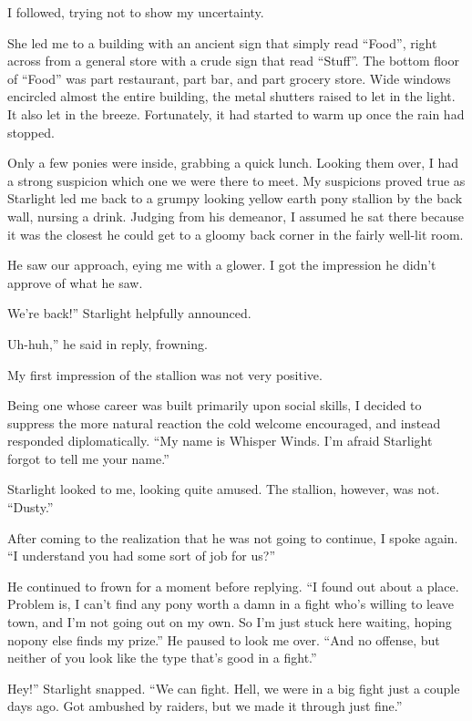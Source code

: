 I followed, trying not to show my uncertainty.

She led me to a building with an ancient sign that simply read “Food”, right across from a general store with a crude sign that read “Stuff”. The bottom floor of “Food” was part restaurant, part bar, and part grocery store. Wide windows encircled almost the entire building, the metal shutters raised to let in the light. It also let in the breeze. Fortunately, it had started to warm up once the rain had stopped.

Only a few ponies were inside, grabbing a quick lunch. Looking them over, I had a strong suspicion which one we were there to meet. My suspicions proved true as Starlight led me back to a grumpy looking yellow earth pony stallion by the back wall, nursing a drink. Judging from his demeanor, I assumed he sat there because it was the closest he could get to a gloomy back corner in the fairly well-lit room.

He saw our approach, eying me with a glower. I got the impression he didn’t approve of what he saw.

\leavevmode{}We’re back!” Starlight helpfully announced.

\leavevmode{}Uh-huh,” he said in reply, frowning.

My first impression of the stallion was not very positive.

Being one whose career was built primarily upon social skills, I decided to suppress the more natural reaction the cold welcome encouraged, and instead responded diplomatically. “My name is Whisper Winds. I’m afraid Starlight forgot to tell me your name.”

Starlight looked to me, looking quite amused. The stallion, however, was not. “Dusty.”

After coming to the realization that he was not going to continue, I spoke again. “I understand you had some sort of job for us?”

He continued to frown for a moment before replying. “I found out about a place. Problem is, I can’t find any pony worth a damn in a fight who’s willing to leave town, and I’m not going out on my own. So I’m just stuck here waiting, hoping nopony else finds my prize.” He paused to look me over. “And no offense, but neither of you look like the type that’s good in a fight.”

\leavevmode{}Hey!” Starlight snapped. “We can fight. Hell, we were in a big fight just a couple days ago. Got ambushed by raiders, but we made it through just fine.”

